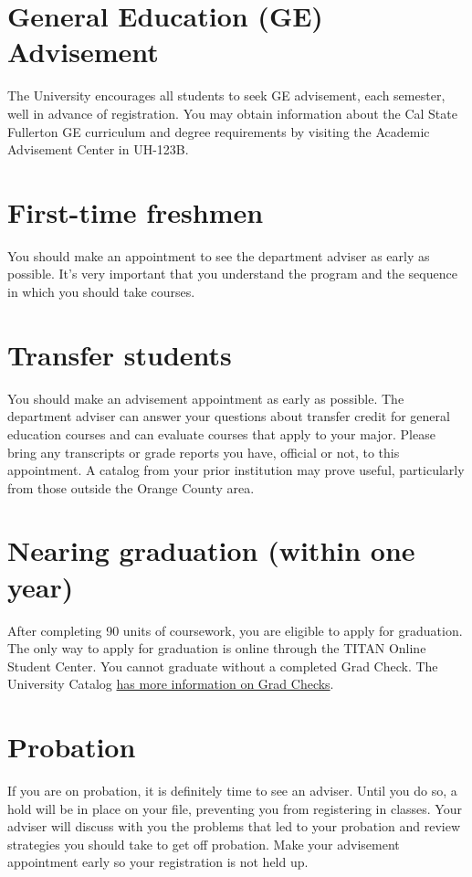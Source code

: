 \documentclass{book}
\begin{document}
\section{General Education (GE) Advisement}
 
The University encourages all students to seek GE advisement, each semester, well in advance of registration.  You may obtain information about the Cal State Fullerton GE curriculum and degree requirements by visiting the Academic Advisement Center in UH-123B.

\section{First-time freshmen}
You should make an appointment to see the department adviser as early as possible. It’s very important that you understand the program and the sequence in which you should take courses.

\section{Transfer students}
You should make an advisement appointment as early as possible. The department adviser can answer your questions about transfer credit for general education courses and can evaluate courses that apply to your major. Please bring any transcripts or grade reports you have, official or not, to this appointment. A catalog from your prior institution may prove useful, particularly from those outside the Orange County area.

\section{Nearing graduation (within one year)}
After completing 90 units of coursework, you are eligible to apply for graduation. The only way to apply for graduation is online through the TITAN Online Student Center. You cannot graduate without a completed Grad Check.  The University Catalog \href{http://catalog.fullerton.edu/content.php?catoid=2&navoid=108#Graduation_Requirement_Check}{has more information on Grad Checks}.

\section{Probation}
If you are on probation, it is definitely time to see an adviser. Until you do so, a hold will be in place on your file, preventing you from registering in classes. Your adviser will discuss with you the problems that led to your probation and review strategies you should take to get off probation. Make your advisement appointment early so your registration is not held up.
\end{document}
